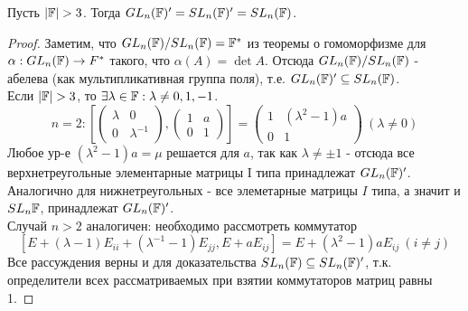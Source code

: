 \begin{subtheorem}
    Пусть $|\mathbb{F}| > 3$. Тогда $GL_n(\mathbb{F})' = SL_n(\mathbb{F})' = SL_n(\mathbb{F})$.
\end{subtheorem}
\begin{proof}
    Заметим, что $GL_n(\mathbb{F}) / SL_n(\mathbb{F}) = \mathbb{F}^*$ из теоремы о гомоморфизме для $\alpha: GL_n(\mathbb{F}) \rightarrow F^*$ такого, что $\alpha(A) = \det A$.
    Отсюда $GL_n(\mathbb{F}) / SL_n(\mathbb{F})$ - абелева (как мультипликативная группа поля), т.е. $GL_n(\mathbb{F})' \subseteq SL_n(\mathbb{F})$.\\
    Если $|\mathbb{F}| > 3$, то $\exists \lambda \in \mathbb{F}: \lambda \neq 0, 1, -1$.
    \[n = 2: \left[\begin{pmatrix} \lambda&0 \\ 0&\lambda^{-1} \end{pmatrix}, \begin{pmatrix} 1&a \\ 0&1 \end{pmatrix}\right] = \begin{pmatrix} 1&(\lambda^2-1)a \\ 0&1 \end{pmatrix} \ (\lambda \neq 0)\]
    Любое ур-е $(\lambda^2 - 1)a = \mu$ решается для $a$, так как $\lambda \neq \pm 1$ - отсюда все верхнетреугольные элементарные матрицы I типа принадлежат $GL_n(\mathbb{F})' $. Аналогично для нижнетреугольных - все элеметарные матрицы $I$ типа, а значит и $SL_n{\mathbb{F}}$, принадлежат $GL_n(\mathbb{F})'$.\\
    Случай $n > 2$ аналогичен: необходимо рассмотреть коммутатор 
    \[[E + (\lambda - 1)E_{ii} + (\lambda^{-1} - 1)E_{jj}, E + aE_{ij}] = E + (\lambda^2 - 1)aE_{ij} \ (i \neq j)\]
    Все рассуждения верны и для доказательства $SL_n(\mathbb{F})\subseteq SL_n(\mathbb{F})' $, т.к. определители всех рассматриваемых при взятии коммутаторов матриц равны 1.
\end{proof}